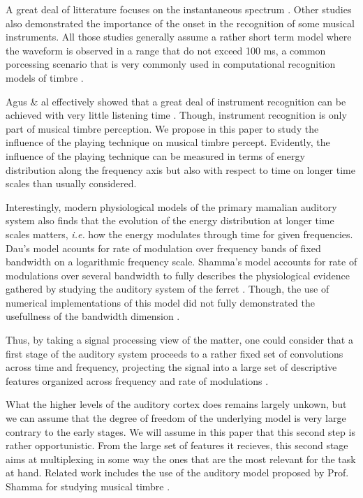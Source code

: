 \documentclass{article}
\begin{document}
A great deal of litterature focuses on the instantaneous spectrum \cite{grey1978perceptual}. Other studies also demonstrated the importance of the onset in the recognition of some musical instruments. All those studies generally assume a rather short term model where the waveform is observed in a range that do not exceed 100 ms, a common porcessing scenario that is very commonly used in computational recognition models of timbre \cite{tzanetakis2002musical}.

Agus \& al effectively showed that a great deal of instrument recognition can be achieved with very little listening time \cite{agus2012fast}. Though, instrument recognition is only part of musical timbre perception. We propose in this paper to study the influence of the playing technique on musical timbre percept. Evidently, the influence of the playing technique can be measured in terms of energy distribution along the frequency axis but also with respect to time on longer time scales than usually considered.

Interestingly, modern physiological models of the primary mamalian auditory system also finds that the evolution of the energy distribution at longer time scales matters, \textit{i.e.} how the energy modulates through time for given frequencies.  Dau's model acounts for  rate of modulation over frequency bands of fixed bandwidth on a logarithmic frequency scale\cite{dau1997modeling}. Shamma's model accounts for rate  of modulations over several bandwidth to fully describes the physiological evidence gathered by studying the auditory system of the ferret \cite{yang1992auditory}. Though, the use of numerical implementations of this model did not fully demonstrated the usefullness of the bandwidth dimension \cite{mesgarani2006discrimination}.

Thus, by taking a signal processing view of the matter, one could consider that a first stage of the auditory system proceeds to a rather fixed set of convolutions across time and frequency, projecting the signal into a large set of descriptive features organized across frequency and rate of modulations \cite{anden2014deep}.

What the higher levels of the auditory cortex does remains largely unkown, but we can assume that the degree of freedom of the underlying model is very large contrary to the early stages.  We will assume in this paper that this second step is rather opportunistic. From the large set of features it recieves, this second stage aims at multiplexing in some way the ones that are the most relevant for the task at hand. Related work includes the use of the auditory model proposed by Prof. Shamma for studying musical timbre \cite{patil2012music}.
\end{document}
